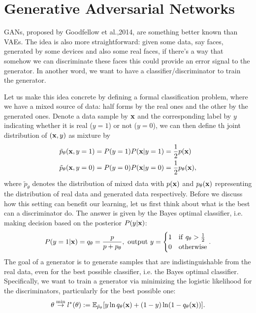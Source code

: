 \documentclass[../book-template.tex]{subfiles}
\begin{document}
\section{Generative Adversarial Networks}
GANs, proposed by Goodfellow et al.,2014, are something better known than VAEs. The idea is also more straightforward: given some data, say faces, generated by some devices and also some real faces, if there's a way that somehow we can discriminate these faces this could provide an error signal to the generator. In another word, we want to have a classifier/discriminator to train the generator.
\par Let us make this idea concrete by defining a formal classification problem, where we have a mixed source of data: half forms by the real ones and the other by the generated ones. Denote a data sample by ${\bf x}$ and the corresponding label by ${y}$ indicating whether it is real ($y=1$) or not ($y=0$), we can then define th joint distribution of $({\bf x},y)$ as mixture by
\begin{align*}
	&\tilde{p}_\theta({\bf x},y=1)=P(y=1)P({\bf x}|y=1)=\frac{1}{2}p({\bf x})\\
	&\tilde{p}_\theta({\bf x},y=0)=P(y=0)P({\bf x}|y=0)=\frac{1}{2}p_\theta({\bf x}),
\end{align*}
where $\tilde{p}_\theta$ denotes the distribution of mixed data with $p({\bf x})$ and $p_\theta({\bf x})$ representing the distribution of real data and generated data respectively. Before we discuss how this setting can benefit our learning, let us first think about what is the best can a discriminator do. The answer is given by the Bayes optimal classifier, i.e. making decision based on the posterior $P(y|{\bf x})$:
\begin{equation*}
	P(y=1|{\bf x}) = q_\theta=\frac{p}{p+p_\theta},\ {\rm output}\ y=\begin{cases}
	1 & {\rm if}\ q_\theta>\frac{1}{2}\\
	0 & {\rm otherwise}
	\end{cases}.
\end{equation*}
The goal of a generator is to generate samples that are indistinguishable from the real data, even for the best possible classifier, i.e. the Bayes optimal classifier. Specifically, we want to train a generator via minimizing the logistic likelihood for the discriminators, particularly for the best possible one:
\begin{equation*}
	\theta\overset{\min}{\rightarrow}l^*(\theta):=\mathbb{E}_{\tilde{p}_\theta}[y\ln q_\theta({\bf x})+(1-y)\ln(1-q_\theta({\bf x}))].
\end{equation*}
\end{document}
